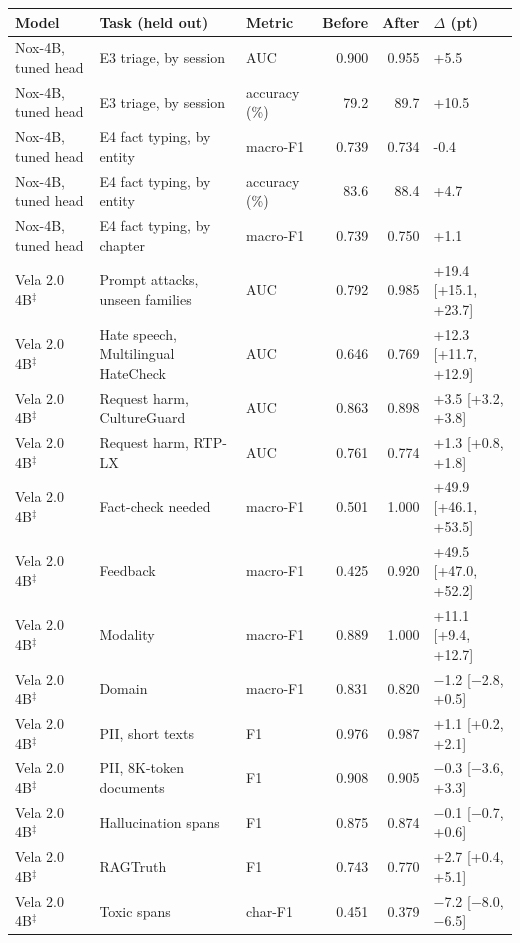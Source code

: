 \begin{tabular}{lllrrl}
\toprule
Model & Task (held out) & Metric & Before & After & $\Delta$ (pt) \\
\midrule
Nox-4B, tuned head & E3 triage, by session & AUC & 0.900 & 0.955 & +5.5 \\
Nox-4B, tuned head & E3 triage, by session & accuracy (\%) & 79.2 & 89.7 & +10.5 \\
Nox-4B, tuned head & E4 fact typing, by entity & macro-F1 & 0.739 & 0.734 & -0.4 \\
Nox-4B, tuned head & E4 fact typing, by entity & accuracy (\%) & 83.6 & 88.4 & +4.7 \\
Nox-4B, tuned head & E4 fact typing, by chapter & macro-F1 & 0.739 & 0.750 & +1.1 \\
\midrule
Vela 2.0 4B$^\ddagger$ & Prompt attacks, unseen families & AUC & 0.792 & 0.985 & +19.4 [+15.1, +23.7] \\
Vela 2.0 4B$^\ddagger$ & Hate speech, Multilingual HateCheck & AUC & 0.646 & 0.769 & +12.3 [+11.7, +12.9] \\
Vela 2.0 4B$^\ddagger$ & Request harm, CultureGuard & AUC & 0.863 & 0.898 & +3.5 [+3.2, +3.8] \\
Vela 2.0 4B$^\ddagger$ & Request harm, RTP-LX & AUC & 0.761 & 0.774 & +1.3 [+0.8, +1.8] \\
Vela 2.0 4B$^\ddagger$ & Fact-check needed & macro-F1 & 0.501 & 1.000 & +49.9 [+46.1, +53.5] \\
Vela 2.0 4B$^\ddagger$ & Feedback & macro-F1 & 0.425 & 0.920 & +49.5 [+47.0, +52.2] \\
Vela 2.0 4B$^\ddagger$ & Modality & macro-F1 & 0.889 & 1.000 & +11.1 [+9.4, +12.7] \\
Vela 2.0 4B$^\ddagger$ & Domain & macro-F1 & 0.831 & 0.820 & $-$1.2 [$-$2.8, +0.5] \\
Vela 2.0 4B$^\ddagger$ & PII, short texts & F1 & 0.976 & 0.987 & +1.1 [+0.2, +2.1] \\
Vela 2.0 4B$^\ddagger$ & PII, 8K-token documents & F1 & 0.908 & 0.905 & $-$0.3 [$-$3.6, +3.3] \\
Vela 2.0 4B$^\ddagger$ & Hallucination spans & F1 & 0.875 & 0.874 & $-$0.1 [$-$0.7, +0.6] \\
Vela 2.0 4B$^\ddagger$ & RAGTruth & F1 & 0.743 & 0.770 & +2.7 [+0.4, +5.1] \\
Vela 2.0 4B$^\ddagger$ & Toxic spans & char-F1 & 0.451 & 0.379 & $-$7.2 [$-$8.0, $-$6.5] \\
\bottomrule
\end{tabular}
